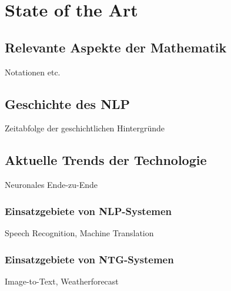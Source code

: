 \chapter{State of the Art}\label{ch:data}

\section{Relevante Aspekte der Mathematik}

Notationen etc.

\section{Geschichte des NLP}

Zeitabfolge der geschichtlichen Hintergründe

\section{Aktuelle Trends der Technologie}

Neuronales Ende-zu-Ende

\subsection{Einsatzgebiete von NLP-Systemen}
Speech Recognition, Machine Translation

\subsection{Einsatzgebiete von NTG-Systemen}
Image-to-Text, Weatherforecast